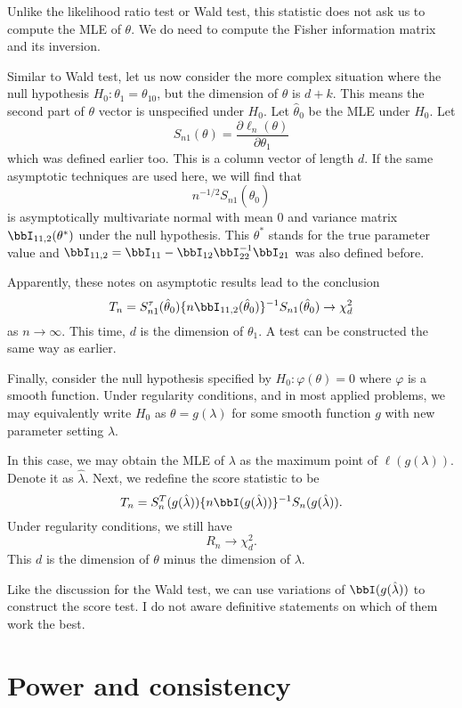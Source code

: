 Unlike the likelihood ratio test or Wald test, 
this statistic does not ask us to compute the MLE
of $\theta$. We do need to compute
the Fisher information matrix and its inversion.

Similar to Wald test, let us now consider the more complex situation
where the null hypothesis $H_0: \theta_1 = \theta_{10}$, but
the dimension of $\theta$ is $d+k$.
This means the second part of $\theta$ vector is unspecified
under $H_0$. Let $\hat \theta_0$ be the MLE under $H_0$.
Let
\[
S_{n1}(\theta) = \frac{ \partial \ell_n(\theta)}{\partial \theta_1}
\]
which was defined earlier too. 
This is a column vector of length $d$. 
If the same asymptotic techniques are used here, we will find that
\[
n^{-1/2} S_{n1}(\hat \theta_0)
\]
is asymptotically multivariate normal with mean 0 and variance matrix
$\bbI_{11,2}(\theta^*)$ under the null hypothesis.
This $\theta^*$ stands for the true parameter value and
$\bbI_{11,2} = \bbI_{11} - \bbI_{12} \bbI_{22}^{-1} \bbI_{21}$ was also defined before.

Apparently, these notes on asymptotic results lead to the conclusion
\[
T_n 
= S^\tau_{n1}(\hat \theta_0)\{n \bbI_{11,2}(\hat \theta_0)\}^{-1} S_{n1}(\hat \theta_0)
\to \chi_d^2
\]
as $n \to \infty$. This time, $d$ is the dimension of $\theta_1$.
A test can be constructed the same way as earlier.

Finally, consider the null hypothesis specified by $H_0: \varphi(\theta) = 0$
where $\varphi$ is a smooth function.
Under regularity conditions, and in most applied problems, we
may equivalently write $H_0$ as $\theta = g(\lambda)$
for some smooth function $g$ with new parameter setting $\lambda$.

In this case, we may obtain the MLE of $\lambda$ as the
maximum point of $\ell(g(\lambda))$. Denote it as $\hat \lambda$.
Next, we redefine the score statistic to be
\[
T_n = S_n^T(g(\hat \lambda)) \{n \bbI(g(\hat \lambda))\}^{-1} S_n(g(\hat \lambda)).
\]
Under regularity conditions, we still have
\[
R_n \to \chi^2_d.
\]
This $d$ is the dimension of $\theta$ minus the dimension of $\lambda$.

Like the discussion for the Wald test, we can use variations
of $\bbI(g(\hat \lambda))$ to construct the score test.
I do not aware definitive statements on which of them work the
best.

\section{Power and consistency}


